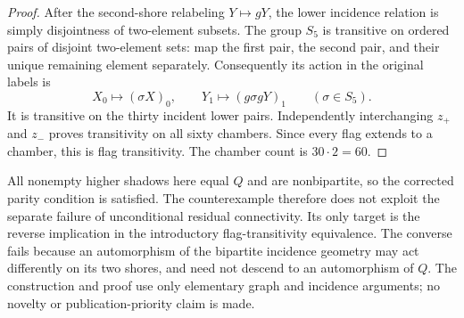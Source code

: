 \begin{proof}
After the second-shore relabeling $Y\mapsto gY$, the lower incidence
relation is simply disjointness of two-element subsets. The group
$S_5$ is transitive on ordered pairs of disjoint two-element sets:
map the first pair, the second pair, and their unique remaining
element separately. Consequently its action in the original labels
is
\[
 X_0\mapsto(\sigma X)_0,\qquad
 Y_1\mapsto(g\sigma gY)_1\qquad(\sigma\in S_5).
\]
It is transitive on the thirty incident lower pairs. Independently
interchanging $z_+$ and $z_-$ proves transitivity on all sixty
chambers. Since every flag extends to a chamber, this is flag
transitivity. The chamber count is $30\cdot2=60$.
\end{proof}

All nonempty higher shadows here equal $Q$ and are nonbipartite,
so the corrected parity condition is satisfied. The counterexample
therefore does not exploit the separate failure of unconditional
residual connectivity. Its only target is the reverse implication
in the introductory flag-transitivity equivalence. The converse
fails because an automorphism of the bipartite incidence geometry
may act differently on its two shores, and need not descend to an
automorphism of $Q$. The construction and proof use only elementary
graph and incidence arguments; no novelty or publication-priority
claim is made.
